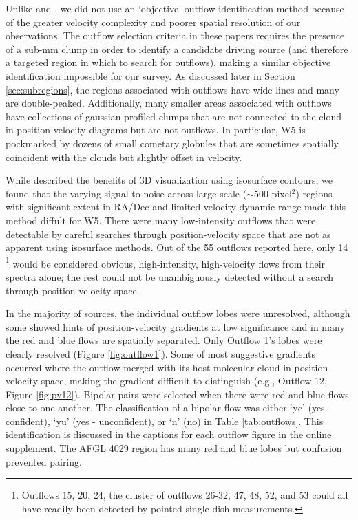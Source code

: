 Unlike \citet{curtis2010} and \citet{hatchell2009}, we did not use an
`objective' outflow identification method because of the greater velocity complexity
and poorer spatial resolution of our observations.  The outflow selection
criteria in these papers requires the presence of a sub-mm clump in order to
identify a candidate driving source (and therefore a targeted region in which to search for
outflows), making a similar objective identification impossible for
our survey.
As discussed later in 
Section \ref{sec:subregions}, the regions associated with outflows have wide
lines and many are double-peaked.  Additionally, many smaller areas associated
with outflows have collections of gaussian-profiled clumps that are not connected to
the cloud in position-velocity diagrams but are not outflows.  In particular,
W5 is pockmarked by dozens of small cometary globules that are sometimes
spatially coincident with the clouds but slightly offset in velocity.

While \citet{arce2010} described the benefits of 3D visualization using
isosurface contours, we found that the varying signal-to-noise across
large-scale ($\sim500$ pixel$^2$) regions with significant extent in RA/Dec and
limited velocity dynamic range made this method diffult for W5.  There
were many low-intensity outflows that were detectable by careful searches
through position-velocity space that are not as apparent using isosurface
methods.  Out of the 55 outflows reported here, only 14 \footnote{
Outflows 15, 20, 24, the cluster of outflows 26-32, 47, 48, 52, and 53 could 
all have readily been detected by pointed single-dish measurements.} would be
considered obvious, high-intensity, high-velocity flows from their spectra
alone; the rest could not be unambiguously detected without a search through
position-velocity space.

In the majority of sources, the individual outflow lobes were
unresolved, although some showed hints of position-velocity gradients at low
significance and in many the red and blue flows are spatially separated.    Only
Outflow 1's lobes were clearly resolved (Figure \ref{fig:outflow1}).  Some of
most suggestive gradients occurred where the outflow merged with its host
molecular cloud in position-velocity space, making the gradient difficult to
distinguish (e.g., Outflow 12, Figure \ref{fig:pv12}).  Bipolar pairs were
selected when there were red and blue flows close to one another.  The
classification of a bipolar flow was either `yc' (yes - confident), `yu' (yes -
unconfident), or `n' (no) in Table \ref{tab:outflows}.  This identification is
discussed in the captions for each outflow figure in the online
supplement. The AFGL 4029 region has many red and blue lobes but confusion
prevented pairing.  

